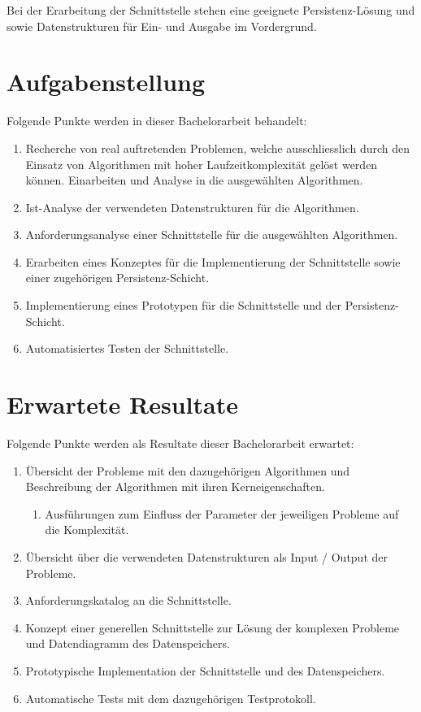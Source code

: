 Bei der Erarbeitung der Schnittstelle stehen eine geeignete Persistenz-Lösung und sowie Datenstrukturen für Ein- und Ausgabe im Vordergrund.

\section{Aufgabenstellung}\label{aufgabenstellung}
Folgende Punkte werden in dieser Bachelorarbeit behandelt:
\begin{enumerate}
\item Recherche von real auftretenden Problemen, welche ausschliesslich durch den Einsatz von Algorithmen mit hoher Laufzeitkomplexität gelöst werden können. Einarbeiten und Analyse in 
die ausgewählten Algorithmen.
\item Ist-Analyse der verwendeten Datenstrukturen für die Algorithmen.
\item Anforderungsanalyse einer Schnittstelle für die ausgewählten Algorithmen.
\item Erarbeiten eines Konzeptes für die Implementierung der Schnittstelle sowie einer zugehörigen Persistenz-Schicht.
\item Implementierung eines Prototypen für die Schnittstelle und der Persistenz-Schicht.
\item Automatisiertes Testen der Schnittstelle.
\end{enumerate}

\section{Erwartete Resultate}\label{erwartete_resultate}
Folgende Punkte werden als Resultate dieser Bachelorarbeit erwartet:
\begin{enumerate}
\item Übersicht der Probleme mit den dazugehörigen Algorithmen und Beschreibung der Algorithmen mit ihren Kerneigenschaften.
      \begin{enumerate}
        \item Ausführungen zum Einfluss der Parameter der jeweiligen Probleme auf die Komplexität.
      \end{enumerate}
\item Übersicht über die verwendeten Datenstrukturen als Input / Output der Probleme.
\item Anforderungskatalog an die Schnittstelle.
\item Konzept einer generellen Schnittstelle zur Lösung der komplexen Probleme und Datendiagramm des Datenspeichers.
\item Prototypische Implementation der Schnittstelle und des Datenspeichers.
\item Automatische Tests mit dem dazugehörigen Testprotokoll.
\end{enumerate}

